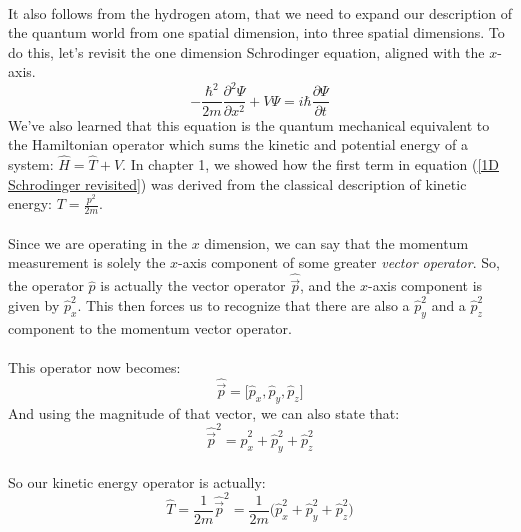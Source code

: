 \documentclass[12pt,letterpaper]{book}
\begin{document}
\paragraph{}It also follows from the hydrogen atom, that we need to expand our description of the quantum world from one spatial dimension, into three spatial dimensions. To do this, let's revisit the one dimension Schrodinger equation, aligned with the $x$-axis.
\begin{equation}
\label{1D Schrodinger revisited}
-\frac{\hbar^2}{2m}\frac{\partial^2\Psi}{\partial x^2} +
V\Psi = i\hbar\frac{\partial \Psi}{\partial t}
\end{equation}
We've also learned that this equation is the quantum mechanical equivalent to the Hamiltonian operator which sums the kinetic and potential energy of a system: $\hat{H} = \hat{T} + \hat{V}$. In chapter 1, we showed how the first term in equation (\ref{1D Schrodinger revisited}) was derived from the classical description of kinetic energy: $T = \frac{p^2}{2m}$.
\paragraph*{}Since we are operating in the $x$ dimension, we can say that the momentum measurement is solely the $x$-axis component of some greater \textit{vector operator}. So, the operator $\hat{p}$ is actually the vector operator $\hat{\vec{p}}$, and the $x$-axis component is given by $\hat{p}_x^2$. This then forces us to recognize that there are also a $\hat{p}_y^2$ and a $\hat{p}_z^2$ component to the momentum vector operator.
\paragraph*{}This operator now becomes:
\begin{equation}
\hat{\vec{p}} = \big[ \hat{p}_x , \hat{p}_y , \hat{p}_z \big]
\end{equation} 
And using the magnitude of that vector, we can also state that:
\begin{equation}
\hat{\vec{p}}^2 = \hat{p}_x^2 + \hat{p}_y^2 + \hat{p}_z^2 
\end{equation}
\paragraph*{}So our kinetic energy operator is actually:
\begin{equation}
\label{3D Cartesian Kinetic}
\hat{T} = \frac{1}{2m}\hat{\vec{p}}^2 = 
\frac{1}{2m}\big( \hat{p}_x^2 + \hat{p}_y^2 + \hat{p}_z^2 \big)
\end{equation}
\end{document}
